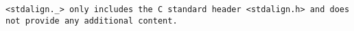 \tt{<stdalign._>} only includes the C standard header
\tt{<stdalign.h>} and does not provide any additional content.
